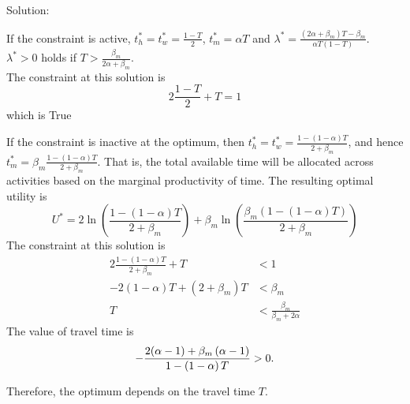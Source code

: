 \documentclass[12pt,a4paper,british]{article}
\begin{document}
Solution:
\begin{casenv}
\item If the constraint is active, $t_{h}^{\ast}=t_{w}^{\ast}=\frac{1-T}{2}$, $t_{m}^{\ast}=\alpha T$ and $\lambda^{\ast}=\frac{\left(2\alpha+\beta_{m}\right)T-\beta_{m}}{\alpha T\left(1-T\right)}$. $\lambda^{\ast}>0$ holds if $T>\frac{\beta_{m}}{2\alpha+\beta_{m}}$.
\\
The constraint at this solution is
\begin{equation*}
2\frac{1-T}{2}+T=1
\end{equation*}
which is True
\item If the constraint is inactive at the optimum, then $t_{h}^{\ast}=t_{w}^{\ast}=\frac{1-\left(1-\alpha\right)T}{2+\beta_{m}}$, and hence $t_{m}^{\ast}=\beta_{m}\frac{1-\left(1-\alpha\right)T}{2+\beta_{m}}$. That is, the total available time will be allocated across activities based on the marginal productivity of time. The resulting optimal utility is
\begin{equation*}
U^{\ast}=2\ln\left(\frac{1-\left(1-\alpha\right)T}{2+\beta_{m}}\right)+\beta_{m}\ln\left(\frac{\beta_{m}\left(1-\left(1-\alpha\right)T\right)}{2+\beta_{m}}\right)
\end{equation*}
The constraint at this solution is
\begin{align*}
2\frac{1-\left(1-\alpha\right)T}{2+\beta_{m}}+T & <1\\
-2\left(1-\alpha\right)T+\left(2+\beta_{m}\right)T & <\beta_{m}\\
T & <\frac{\beta_{m}}{\beta_{m}+2\alpha}
\end{align*}
The value of travel time is
\begin{equation*}
-\frac{2\text{\ensuremath{\left(\alpha-1\right)}}+\beta_{m}\left(\alpha-1\right)}{1-\left(1-\alpha\right)T}>0.
\end{equation*}
\end{casenv}
Therefore, the optimum depends on the travel time $T$.

\end{document}
